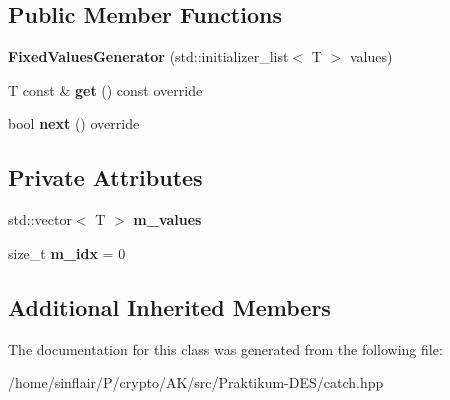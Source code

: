\subsection*{Public Member Functions}
\begin{DoxyCompactItemize}
\item 
\mbox{\label{classCatch_1_1Generators_1_1FixedValuesGenerator_a6e9f473655413c1cb15f079890f06b86}} 
{\bfseries Fixed\+Values\+Generator} (std\+::initializer\+\_\+list$<$ T $>$ values)
\item 
\mbox{\label{classCatch_1_1Generators_1_1FixedValuesGenerator_ad2ea8c959c600386bcc4b2656b40d33e}} 
T const  \& {\bfseries get} () const override
\item 
\mbox{\label{classCatch_1_1Generators_1_1FixedValuesGenerator_a6ce9e3ed045239c7b82873f24bd9cd3b}} 
bool {\bfseries next} () override
\end{DoxyCompactItemize}
\subsection*{Private Attributes}
\begin{DoxyCompactItemize}
\item 
\mbox{\label{classCatch_1_1Generators_1_1FixedValuesGenerator_a591837f944b435858bc3b9fa73502ee6}} 
std\+::vector$<$ T $>$ {\bfseries m\+\_\+values}
\item 
\mbox{\label{classCatch_1_1Generators_1_1FixedValuesGenerator_a14c3c77deb624c09065e5ccaf8646f33}} 
size\+\_\+t {\bfseries m\+\_\+idx} = 0
\end{DoxyCompactItemize}
\subsection*{Additional Inherited Members}


The documentation for this class was generated from the following file\+:\begin{DoxyCompactItemize}
\item 
/home/sinflair/\+P/crypto/\+A\+K/src/\+Praktikum-\/\+D\+E\+S/catch.\+hpp\end{DoxyCompactItemize}
